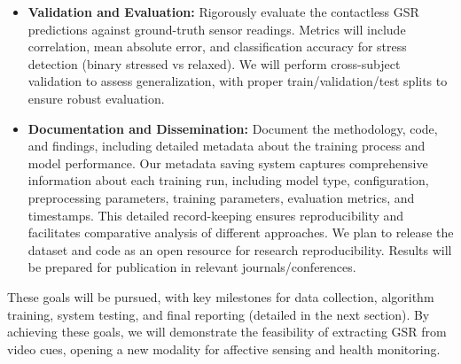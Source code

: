 \documentclass[12pt]{article}
\begin{document}
\begin{itemize}
        \item \textbf{Validation and Evaluation:} Rigorously evaluate the contactless GSR predictions against ground-truth sensor readings. Metrics will include correlation, mean absolute error, and classification accuracy for stress detection (binary stressed vs relaxed). We will perform cross-subject validation to assess generalization, with proper train/validation/test splits to ensure robust evaluation.
        \item \textbf{Documentation and Dissemination:} Document the methodology, code, and findings, including detailed metadata about the training process and model performance. Our metadata saving system captures comprehensive information about each training run, including model type, configuration, preprocessing parameters, training parameters, evaluation metrics, and timestamps. This detailed record-keeping ensures reproducibility and facilitates comparative analysis of different approaches. We plan to release the dataset and code as an open resource for research reproducibility. Results will be prepared for publication in relevant journals/conferences.
    \end{itemize}

    These goals will be pursued, with key milestones for data collection, algorithm training, system testing, and final reporting (detailed in the next section). By achieving these goals, we will demonstrate the feasibility of extracting GSR from video cues, opening a new modality for affective sensing and health monitoring.
\end{document}
